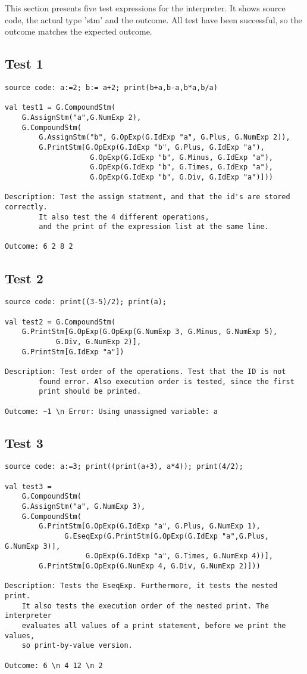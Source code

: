 \documentclass[a4paper]{article}
\begin{document}
This section presents five test expressions for the interpreter. It shows source code, the actual type 'stm' and the outcome. All test have been successful, so the outcome matches the expected outcome. 



\subsection{Test 1}
\begin{lstlisting}
source code: a:=2; b:= a+2; print(b+a,b-a,b*a,b/a)

val test1 = G.CompoundStm(
	G.AssignStm("a",G.NumExp 2),
	G.CompoundStm(
	    G.AssignStm("b", G.OpExp(G.IdExp "a", G.Plus, G.NumExp 2)),
	    G.PrintStm[G.OpExp(G.IdExp "b", G.Plus, G.IdExp "a"),
	    			G.OpExp(G.IdExp "b", G.Minus, G.IdExp "a"),
	    			G.OpExp(G.IdExp "b", G.Times, G.IdExp "a"),
	    			G.OpExp(G.IdExp "b", G.Div, G.IdExp "a")]))

Description: Test the assign statment, and that the id's are stored correctly.
		It also test the 4 different operations, 
		and the print of the expression list at the same line.

Outcome: 6 2 8 2
\end{lstlisting}

\subsection{Test 2}
\begin{lstlisting}
source code: print((3-5)/2); print(a);

val test2 = G.CompoundStm(
	G.PrintStm[G.OpExp(G.OpExp(G.NumExp 3, G.Minus, G.NumExp 5),
			G.Div, G.NumExp 2)],
	G.PrintStm[G.IdExp "a"])

Description: Test order of the operations. Test that the ID is not
		found error. Also execution order is tested, since the first 
		print should be printed.

Outcome: ~1 \n Error: Using unassigned variable: a
\end{lstlisting}

\subsection{Test 3}
\begin{lstlisting}
source code: a:=3; print((print(a+3), a*4)); print(4/2);

val test3 = 
    G.CompoundStm(
	G.AssignStm("a", G.NumExp 3),
	G.CompoundStm(
	    G.PrintStm[G.OpExp(G.IdExp "a", G.Plus, G.NumExp 1), 
		      G.EseqExp(G.PrintStm[G.OpExp(G.IdExp "a",G.Plus, G.NumExp 3)],
			       G.OpExp(G.IdExp "a", G.Times, G.NumExp 4))],
	    G.PrintStm[G.OpExp(G.NumExp 4, G.Div, G.NumExp 2)]))

Description: Tests the EseqExp. Furthermore, it tests the nested print.
	It also tests the execution order of the nested print. The interpreter
	evaluates all values of a print statement, before we print the values,
	so print-by-value version. 

Outcome: 6 \n 4 12 \n 2
\end{lstlisting}
\end{document}
